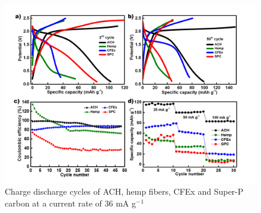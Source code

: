 \documentclass{article}
\begin{document}
\begin{figure}[h]
  \centering
  \includegraphics[width=\textwidth]{figures/fig1}
    \caption{Charge discharge cycles of ACH, hemp fibers, CFEx and Super-P carbon at a current rate of 36 mA g$^-{^1}$}
  \label{figures:fig1}
\end{figure}
\end{document}
